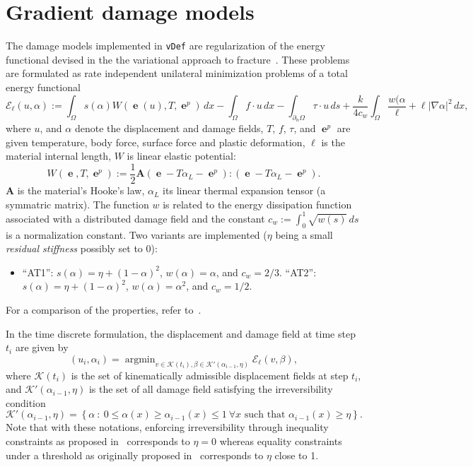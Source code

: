 \documentclass[10pt,oneside]{memoir}
\def\vDef{{\texttt{vDef}} }
\DeclareMathOperator*{\argmin}{argmin}
\DeclareMathOperator{\e}{{\mathbf e}}
\begin{document}
\section{Gradient damage models}
\label{sec:GradientDamageModels}
The damage models implemented in \vDef are regularization of the energy functional devised in the the variational approach to fracture~\cite{Ambrosio-Tortorelli-1990,Ambrosio-Tortorelli-1992,Giacomini-2005,Sicsic-Marigo-2013a}. These problems are formulated as rate independent unilateral minimization problems of a total energy functional
\begin{equation}
	\label{eq:defEll}
	\mathcal{E}_\ell(u,\alpha) := \int_\Omega s(\alpha) W(\e(u),T,\e^p)\, dx - \int_\Omega f\cdot u \, dx - \int_{\partial_n \Omega} \tau \cdot u \, ds + \frac{k}{4c_w} \int_\Omega \frac{w(\alpha}{\ell} + \ell|\nabla \alpha|^2\, dx,
\end{equation}
where $u$, and $\alpha$ denote the displacement and damage fields, $T$, $f$, $\tau$, and $\e^p$ are given temperature, body force, surface force and plastic deformation, $\ell$ is the material internal length, $W$ is linear elastic potential:
$$
W(\e,T,\e^p) := \frac{1}{2} \mathbf{A}\left(\e-T \alpha_L-\e^p\right):\left(\e-T \alpha_L-\e^p\right).
$$
$\mathbf{A}$ is the material's Hooke's law, $\alpha_L$ its linear thermal expansion tensor (a symmatric matrix).
The function $w$ is related to the energy dissipation function associated with a distributed damage field and the constant $c_w:= \int_0^1 \sqrt{w(s)}\, ds$ is a normalization constant.
Two variants are implemented ($\eta$ being a small \emph{residual stiffness} possibly set to 0):
\begin{itemize}
\item
	``AT1'': $s(\alpha) = \eta + (1-\alpha)^2$, $w(\alpha) = \alpha$, and $c_w =2/3$.
	``AT2'': $s(\alpha) = \eta + (1-\alpha)^2$, $w(\alpha) = \alpha^2$, and $c_w = 1/2$.
\end{itemize}
For a comparison of the properties, refer to~\cite{Pham-Amor-EtAl-2011a}.


 In the time discrete formulation, the displacement and damage field at time step $t_i$ are given by
\begin{equation}
	\label{eq:globMin}
	(u_i,\alpha_i) = \argmin_{v \in \mathcal{K}(t_i), \beta \in \mathcal{K}'(\alpha_{i-1},\eta)} \mathcal{E}_\ell(v,\beta),
\end{equation}
where $\mathcal{K}(t_i)$ is the set of kinematically admissible displacement fields at step $t_i$, and $\mathcal{K}'(\alpha_{i-1},\eta)$ is the set of all damage field satisfying the irreversibility condition
$$
	\mathcal{K}'(\alpha_{i-1},\eta) = \left\{\alpha \ :\  0 \le \alpha(x) \ge \alpha_{i-1}(x) \le 1 \ \forall x \text{ such that } \alpha_{i-1}(x) \ge \eta\right\}.
$$
Note that with these notations, enforcing irreversibility through inequality constraints as proposed in~\cite{Giacomini-2005,Amor-Marigo-EtAl-2008a,Pham-Amor-EtAl-2011a} corresponds to $\eta = 0$ whereas equality constraints under a threshold as originally proposed in~\cite{Bourdin-Francfort-EtAl-2000a} corresponds to $\eta$ close to 1.
\end{document}
